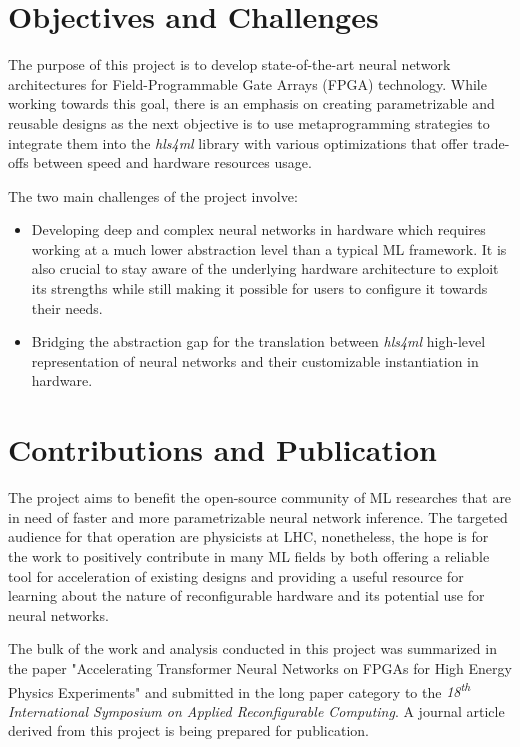 \section{Objectives and Challenges}
The purpose of this project is to develop state-of-the-art neural network architectures for Field-Programmable Gate Arrays (FPGA) technology. While working towards this goal, there is an emphasis on creating parametrizable and reusable designs as the next objective is to use metaprogramming strategies to integrate them into the \textit{hls4ml} library with various optimizations that offer trade-offs between speed and hardware resources usage.

The two main challenges of the project involve:
\begin{itemize}
  \item Developing deep and complex neural networks in hardware which requires working at a much lower abstraction level than a typical ML framework. It is also crucial to stay aware of the underlying hardware architecture to exploit its strengths while still making it possible for users to configure it towards their needs.
  \item Bridging the abstraction gap for the translation between \textit{hls4ml} high-level representation of neural networks and their customizable instantiation in hardware.
\end{itemize}


\section{Contributions and Publication}
The project aims to benefit the open-source community of ML researches that are in need of faster and more parametrizable neural network inference. The targeted audience for that operation are physicists at LHC, nonetheless, the hope is for the work to positively contribute in many ML fields by both offering a reliable tool for acceleration of existing designs and providing a useful resource for learning about the nature of reconfigurable hardware and its potential use for neural networks.

The bulk of the work and analysis conducted in this project was summarized in the paper "Accelerating Transformer Neural Networks on FPGAs for High Energy Physics Experiments" and submitted in the long paper category to the \textit{18\textsuperscript{th} International Symposium on Applied Reconfigurable Computing}. A journal article derived from this project is being prepared for publication.

